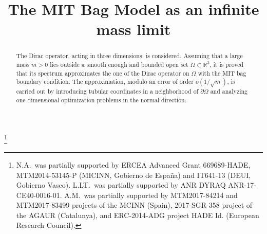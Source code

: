 \documentclass[JEP,XML,SOM,Unicode]{cedram}
\theoremstyle{plain}
\theoremstyle{definition}
\begin{document}
\title[An infinite mass limit]{The MIT Bag Model as an infinite mass limit}

\author[\initial{N.} \lastname{Arrizabalaga}]{ }
\address{Departamento de Matemáticas, Universidad del País Vasco/Euskal Herriko Unibertsitatea (UPV/EHU)\\
48080 Bilbao, Spain}

\author[\initial{L.} \lastname{Le Treust}]{ }
\address{Aix Marseille Univ, CNRS, Centrale Marseille, I2M\\
Marseille, France}

\author[\initial{A.} \lastname{Mas}]{ }
\address{Departament de Matemàtiques, Universitat Politècnica de Catalunya\\
Campus Diagonal Besòs, Edifici A (EEBE), Av. Eduard Maristany 16, 08019 Barcelona, Spain}

\author[\initial{N.} \lastname{Raymond}]{ }
\address{Laboratoire Angevin de Recherche en Mathématiques, LAREMA, UMR 6093, UNIV Angers, SFR Math-STIC\\
2, boulevard Lavoisier, 49045 Angers Cedex 01, France}

\thanks{N.A.\ was partially supported by ERCEA Advanced Grant 669689-HADE, MTM2014-53145-P (MICINN, Gobierno de España) and IT641-13 (DEUI, Gobierno Vasco).
L.LT.\ was partially supported by ANR DYRAQ ANR-17-CE40-0016-01.
A.M.\ was partially supported by
MTM2017-84214 and MTM2017-83499 projects of the MCINN (Spain),
2017-SGR-358 project of the AGAUR (Catalunya), and ERC-2014-ADG project
HADE Id. (European Research Council).}



\begin{abstract}
The Dirac operator, acting in three dimensions, is considered. Assuming that a large mass $m>0$ lies outside a smooth enough and bounded open set $\Omega\subset\mathbb{R}^3$, it is proved that its spectrum approximates the one of the Dirac operator on $\Omega$ with the MIT bag boundary condition. The approximation, modulo an error of order $o(1/\sqrt m)$, is carried out by introducing tubular coordinates in a neighborhood of $\partial\Omega$ and analyzing one dimensional optimization problems in the normal direction.
\end{abstract}
\end{document}
